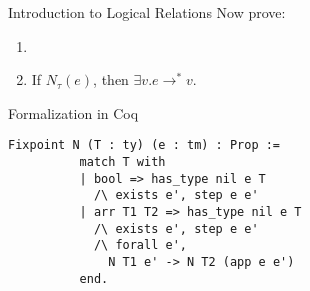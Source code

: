 \documentclass{beamer}
\begin{document}
\begin{frame}{Introduction to Logical Relations}
    Now prove:
    \begin{enumerate}
        \item {}
        \item If $N_\tau(e)$, then $\exists v . e\rightarrow^* v$.
    \end{enumerate}
\end{frame}

\begin{frame}[fragile]{Formalization in Coq}
    \begin{lstlisting}[language={[Objective]Caml},basicstyle=\footnotesize\ttfamily,keywordstyle=\bfseries]
        Fixpoint N (T : ty) (e : tm) : Prop :=
          match T with
          | bool => has_type nil e T
            /\ exists e', step e e'
          | arr T1 T2 => has_type nil e T
            /\ exists e', step e e'
            /\ forall e',
              N T1 e' -> N T2 (app e e')
          end.
    \end{lstlisting}
\end{frame}
\end{document}
